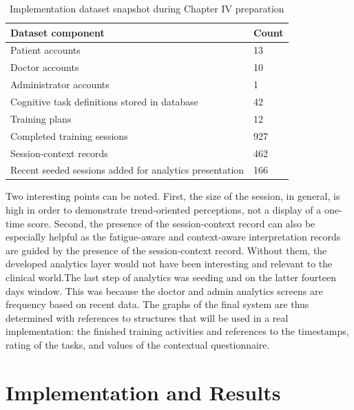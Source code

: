 \documentclass[12pt,a4paper]{report}
\begin{document}
\begin{table}[htbp]
\centering
\caption{Implementation dataset snapshot during Chapter IV preparation}
\label{tab:chapter4_dataset_snapshot}
\begin{tabular}{|p{7.6cm}|p{4cm}|}
\hline
\textbf{Dataset component} & \textbf{Count} \\
\hline
Patient accounts & 13 \\
\hline
Doctor accounts & 10 \\
\hline
Administrator accounts & 1 \\
\hline
Cognitive task definitions stored in database & 42 \\
\hline
Training plans & 12 \\
\hline
Completed training sessions & 927 \\
\hline
Session-context records & 462 \\
\hline
Recent seeded sessions added for analytics presentation & 166 \\
\hline
\end{tabular}
\end{table}


Two interesting points can be noted. First, the size of the session, in general, is high in order to demonstrate trend-oriented perceptions, not a display of a one-time score. Second, the presence of the session-context record can also be especially helpful as the fatigue-aware and context-aware interpretation records are guided by the presence of the session-context record. Without them, the developed analytics layer would not have been interesting and relevant to the clinical world.The last step of analytics was seeding and on the latter fourteen days window. This was because the doctor and admin analytics screens are frequency based on recent data. The graphs of the final system are thus determined with references to structures that will be used in a real implementation: the finished training activities and references to the timestamps, rating of the tasks, and values of the contextual questionnaire.

\section{Implementation and Results}
\end{document}
